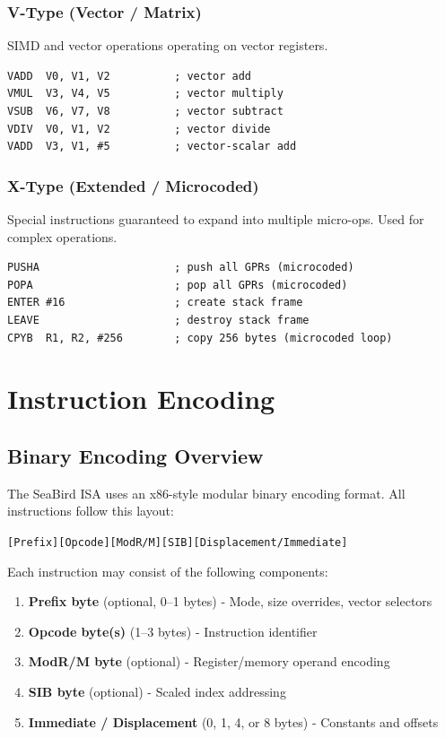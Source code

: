 \documentclass[12pt]{article}
\begin{document}
\subsubsection{V-Type (Vector / Matrix)}

SIMD and vector operations operating on vector registers.

\begin{lstlisting}
VADD  V0, V1, V2          ; vector add
VMUL  V3, V4, V5          ; vector multiply
VSUB  V6, V7, V8          ; vector subtract
VDIV  V0, V1, V2          ; vector divide
VADD  V3, V1, #5          ; vector-scalar add
\end{lstlisting}

\subsubsection{X-Type (Extended / Microcoded)}

Special instructions guaranteed to expand into multiple micro-ops. Used for complex operations.

\begin{lstlisting}
PUSHA                     ; push all GPRs (microcoded)
POPA                      ; pop all GPRs (microcoded)
ENTER #16                 ; create stack frame
LEAVE                     ; destroy stack frame
CPYB  R1, R2, #256        ; copy 256 bytes (microcoded loop)
\end{lstlisting}

\section{Instruction Encoding}

\subsection{Binary Encoding Overview}

The SeaBird ISA uses an x86-style modular binary encoding format. All instructions follow this layout:

\begin{center}
\texttt{[Prefix][Opcode][ModR/M][SIB][Displacement/Immediate]}
\end{center}

Each instruction may consist of the following components:

\begin{enumerate}
    \item \textbf{Prefix byte} (optional, 0--1 bytes) - Mode, size overrides, vector selectors
    \item \textbf{Opcode byte(s)} (1--3 bytes) - Instruction identifier
    \item \textbf{ModR/M byte} (optional) - Register/memory operand encoding
    \item \textbf{SIB byte} (optional) - Scaled index addressing
    \item \textbf{Immediate / Displacement} (0, 1, 4, or 8 bytes) - Constants and offsets
\end{enumerate}
\end{document}
